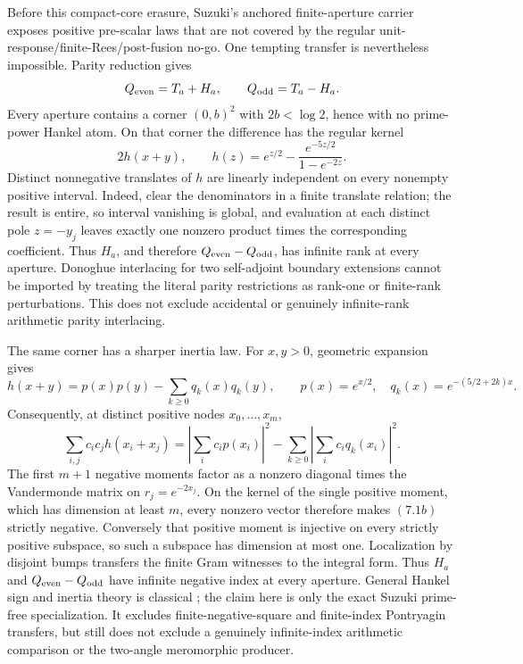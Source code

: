 \documentclass[11pt]{article}
\theoremstyle{definition}
\theoremstyle{remark}
\begin{document}
Before this compact-core erasure, Suzuki's anchored finite-aperture carrier
\cite{Suzuki2026} exposes positive pre-scalar laws that are not covered by the regular
unit-response/finite-Rees/post-fusion no-go.  One tempting transfer is nevertheless impossible.
Parity reduction gives
\[
 Q_{\rm even}=T_a+H_a,\qquad Q_{\rm odd}=T_a-H_a.
\]
Every aperture contains a corner \((0,b)^2\) with \(2b<\log2\), hence with no prime-power Hankel
atom.  On that corner the difference has the regular kernel
\[
 2h(x+y),\qquad
 h(z)=e^{z/2}-\frac{e^{-5z/2}}{1-e^{-2z}}.
\]
Distinct nonnegative translates of \(h\) are linearly independent on every nonempty positive
interval.  Indeed, clear the denominators in a finite translate relation; the result is entire,
so interval vanishing is global, and evaluation at each distinct pole \(z=-y_j\) leaves exactly
one nonzero product times the corresponding coefficient.  Thus \(H_a\), and therefore
\(Q_{\rm even}-Q_{\rm odd}\), has infinite rank at every aperture.  Donoghue interlacing for two
self-adjoint boundary extensions cannot be imported by treating the literal parity restrictions
as rank-one or finite-rank perturbations.  This does not exclude accidental or genuinely
infinite-rank arithmetic parity interlacing.

The same corner has a sharper inertia law.  For \(x,y>0\), geometric expansion gives
\[
 h(x+y)=p(x)p(y)-\sum_{k\geq0}q_k(x)q_k(y),\qquad
 p(x)=e^{x/2},\quad q_k(x)=e^{-(5/2+2k)x}.                 \tag{7.1a}
\]
Consequently, at distinct positive nodes \(x_0,\ldots,x_m\),
\[
 \sum_{i,j}c_ic_jh(x_i+x_j)
 =\left|\sum_i c_ip(x_i)\right|^2
  -\sum_{k\geq0}\left|\sum_i c_iq_k(x_i)\right|^2.        \tag{7.1b}
\]
The first \(m+1\) negative moments factor as a nonzero diagonal times the Vandermonde matrix on
\(r_j=e^{-2x_j}\).  On the kernel of the single positive moment, which has dimension at least
\(m\), every nonzero vector therefore makes \((7.1b)\) strictly negative.  Conversely that
positive moment is injective on every strictly positive subspace, so such a subspace has
dimension at most one.  Localization by disjoint bumps transfers the finite Gram witnesses to
the integral form.  Thus \(H_a\) and \(Q_{\rm even}-Q_{\rm odd}\) have infinite negative index
at every aperture.  General Hankel sign and inertia theory is classical
\cite{Yafaev2013}; the claim here is only the exact Suzuki prime-free specialization.  It excludes
finite-negative-square and finite-index Pontryagin transfers, but still does not exclude a
genuinely infinite-index arithmetic comparison or the two-angle meromorphic producer.
\end{document}
